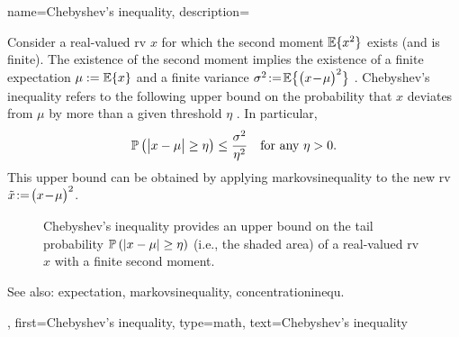 {name={Chebyshev's inequality},
	description={Consider a real-valued \gls{rv} $x$ for which 
		the second moment $\mathbb{E}\{ x^{2} \}$ exists (and is finite). 
 	 	The existence of the second moment implies the existence 
 	 	of a finite \gls{expectation} $\mu := \mathbb{E}\{ x\}$ and a finite 
 	 	\gls{variance} $\sigma^{2}\!:=\!\mathbb{E} \big\{ \big( x\!-\!\mu \big)^{2} \big\}$ \cite[Proposition 6.12]{folland1999real}. 
 	 	Chebyshev's inequality refers 
 	 	to the following upper bound on the \gls{probability} that $x$ 
 	 	deviates from $\mu$ by more than a given threshold $\eta$ 
 	 	\cite[Ch. 4]{FellerBook}. 
 	 	In particular,   
 		\begin{equation}
           		\nonumber
			\mathbb{P}\left(\big|x - \mu \big| \geq \eta \right) \leq \frac{\sigma^2}{\eta^2} \quad \mbox{for any } \eta > 0.
     		\end{equation}
 		This upper bound can be obtained by applying \gls{markovsinequality} to 
 		the new \gls{rv} $\tilde{x}\!:=\! \big(x\!-\!\mu \big)^2$. 
  		\begin{figure}[H]
   			\centering
  		\caption{Chebyshev's inequality provides an upper bound on 
              		the tail \gls{probability} $\mathbb{P}\left(|x-\mu|\ge \eta\right)$ (i.e., the shaded area) of
			a real-valued \gls{rv} $x$ with a finite second moment.\label{fig:chebyshev_minimal_dict}} 
		\end{figure}
     		See also: \gls{expectation}, \gls{markovsinequality}, \gls{concentrationinequ}.},
    	first={Chebyshev's inequality},
	type=math, 
     	text={Chebyshev's inequality}  
}


